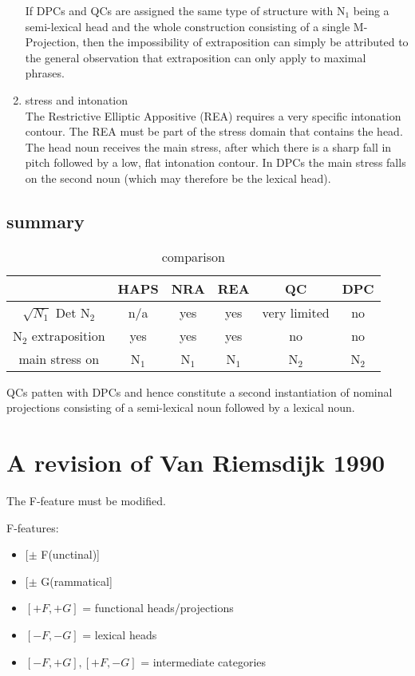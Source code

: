 \documentclass{article}
\begin{document}
\begin{enumerate}
\begin{example}
   \glt
   \glend
   \end{example}
 
If DPCs and QCs are assigned the same type of structure with N$_{1}$ being a semi-lexical head and the whole construction consisting of a single M-Projection, then the impossibility of extraposition can simply be attributed to the general observation that extraposition can only apply to maximal phrases.
\item stress and intonation\\
The Restrictive Elliptic Appositive (REA) requires a very specific intonation contour. The REA must be part of the stress domain that contains the head. The head noun receives the main stress, after which there is a sharp fall in pitch followed by a low, flat intonation contour. In DPCs the main stress falls on the second noun (which may therefore be the lexical head).


\end{enumerate}

\subsection{summary}
\begin{table}[htdp]
\caption{comparison}
\begin{center}
\begin{tabular}{|c|c|c|c||c|c|}
\hline
& HAPS &NRA &REA & QC & DPC\\
\hline
$\sqrt{ N_{1}}$ Det N$_{2}$ & n/a & yes & yes& very limited& no\\
\hline
N$_{2}$ extraposition & yes & yes & yes & no & no \\
\hline
main stress on & N$_{1}$ & N$_{1}$ & N$_{1}$ & N$_{2}$ & N$_{2}$ \\
\hline
\end{tabular}
\end{center}
\end{table}%

QCs patten with DPCs and hence constitute a second instantiation of nominal projections consisting of a semi-lexical noun followed by a lexical noun.


\section{A revision of Van Riemsdijk 1990}
The F-feature must be modified. 
\begin{example}
\label{}
F-features:
\begin{itemize}
\item $[\pm$ F(unctinal)]
\item $[\pm$ G(rammatical]
\item $[+F, +G]$ = functional heads/projections
\item $[-F, -G]$ = lexical heads
\item $[-F, +G], [+F, -G]$ = intermediate categories
\end{itemize}
   \end{example}
\end{document}
